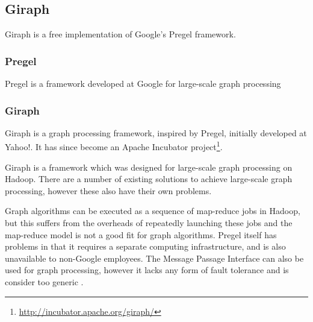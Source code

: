 \subsection{Giraph}
Giraph is a free implementation of Google's Pregel framework.

\subsubsection{Pregel}
Pregel is a framework developed at Google for large-scale graph processing \cite{pregel}

\subsubsection{Giraph}
Giraph is a graph processing framework, inspired by Pregel, initially developed at Yahoo!. It has since become an Apache Incubator project\footnote{\url{http://incubator.apache.org/giraph/}}.

Giraph is a framework which was designed for large-scale graph processing on Hadoop. There are a number of existing solutions to achieve large-scale graph processing, however these also have their own problems.

Graph algorithms can be executed as a sequence of map-reduce jobs in Hadoop, but this suffers from the overheads of repeatedly launching these jobs and the map-reduce model is not a good fit for graph algorithms. Pregel itself has problems in that it requires a separate computing infrastructure, and is also unavailable to non-Google employees. The Message Passage Interface can also be used for graph processing, however it lacks any form of fault tolerance and is consider too generic \cite{giraphtalk}.